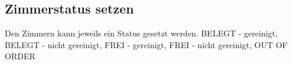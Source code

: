 \documentclass[../SubfileFeatures.tex]{subfiles}
\begin{document}
    \subsection{Zimmerstatus setzen}
	Den Zimmern kann jeweils ein Status gesetzt werden.
	BELEGT - gereinigt, BELEGT - nicht gereinigt, FREI - gereinigt, FREI - nicht gereinigt, OUT OF ORDER
\end{document}

